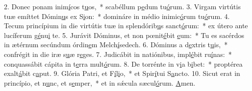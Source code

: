 2. Donec ponam inim\uline{í}cos t\uline{u}os,~* scabéllum p\uline{e}dum tu\uline{ó}rum.
3. Virgam virtútis tuæ emíttet Dómin\uline{u}s ex S\uline{i}on:~* domináre in médio inimic\uline{ó}rum tu\uline{ó}rum.
4. Tecum princípium in die virtútis tuæ in splendórib\uline{u}s sanct\uline{ó}rum:~* ex útero ante lucíferum g\uline{é}nu\uline{i} te.
5. Jurávit Dóminus, et non pœnit\uline{é}bit \uline{e}um:~* Tu es sacérdos in ætérnum secúndum órdin\uline{e}m Melch\uline{í}sedech.
6. Dóminus a d\uline{e}xtris t\uline{u}is,~* confrégit in die iræ s\uline{u}æ r\uline{e}ges.
7. Judicábit in natiónibus, impl\uline{é}bit ru\uline{í}nas:~* conquassábit cápita in t\uline{e}rra mult\uline{ó}rum.
8. De torrénte in v\uline{i}a b\uline{i}bet:~* proptérea exalt\uline{á}bit c\uline{a}put.
9. Glória Patri, et F\uline{í}l\uline{i}o,~* et Spir\uline{í}tui S\uline{a}ncto.
10. Sicut erat in princípio, et n\uline{u}nc, et s\uline{e}mper,~* et in sǽcula sæcul\uline{ó}rum. \uline{A}men.
